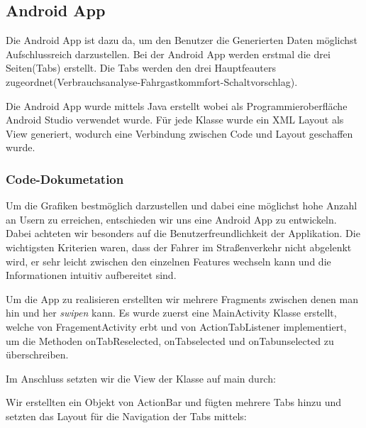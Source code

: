 \subsection{Android App}
Die Android App ist dazu da, um den Benutzer die Generierten Daten möglichst Aufschlussreich darzustellen.
Bei der Android App werden erstmal die drei Seiten(Tabs) erstellt. Die Tabs werden den drei Hauptfeauters zugeordnet(Verbrauchsanalyse-Fahrgastkommfort-Schaltvorschlag). 

\label{subsec:androidapp}

Die Android App wurde mittels Java erstellt wobei als Programmieroberfläche Android Studio verwendet wurde.
Für jede Klasse wurde ein XML Layout als View generiert, wodurch eine Verbindung zwischen Code und Layout geschaffen wurde.

\subsubsection{Code-Dokumetation}
 Um die Grafiken bestmöglich darzustellen und dabei eine möglichst hohe Anzahl an Usern zu erreichen, entschieden wir uns eine Android App zu entwickeln.
 Dabei achteten wir besonders auf die Benutzerfreundlichkeit der Applikation.
 Die wichtigsten Kriterien waren, dass der Fahrer im Straßenverkehr nicht abgelenkt wird, er sehr leicht zwischen den einzelnen Features wechseln kann und die Informationen intuitiv aufbereitet sind.
 
 Um die App zu realisieren erstellten wir mehrere Fragments zwischen denen man hin und her \textit{swipen} kann.
  Es wurde zuerst eine MainActivity Klasse erstellt, welche von FragementActivity erbt und von ActionTabListener implementiert, um die Methoden onTabReselected, onTabselected und onTabunselected zu überschreiben. 



  
 
            
Im Anschluss setzten wir die View der Klasse auf main durch:  



Wir erstellten ein Objekt von ActionBar und fügten mehrere Tabs hinzu und setzten das Layout für die Navigation der Tabs mittels:




